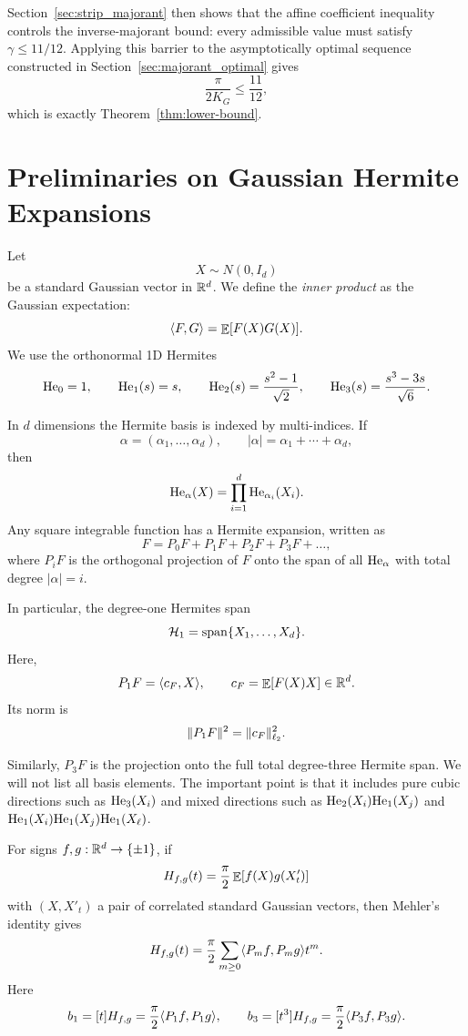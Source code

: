 Section~\ref{sec:strip_majorant} then shows that the affine coefficient inequality controls the inverse-majorant bound: every admissible value must satisfy $\gamma\le11/12$. Applying this barrier to the asymptotically optimal sequence constructed in Section~\ref{sec:majorant_optimal} gives
\[
        \frac{\pi}{2K_G}\le\frac{11}{12},
\]
which is exactly Theorem~\ref{thm:lower-bound}.

\section{Preliminaries on Gaussian Hermite Expansions}
\label{sec:preliminaries}

Let
\[
        X\sim N(0,I_d)
\]
be a standard Gaussian vector in $\mathbb{R}^d$. We define the \textit{inner product} as the Gaussian expectation:
\[
        \langle F,G\rangle=\mathop{\mathbb{E}}[F(X)G(X)].
\]
We use the orthonormal 1D Hermites
\[
        \mathrm{He}_0=1,\qquad
        \mathrm{He}_1(s)=s,\qquad
        \mathrm{He}_2(s)=\frac{s^2-1}{\sqrt2},\qquad
        \mathrm{He}_3(s)=\frac{s^3-3s}{\sqrt6}.
\]

In $d$ dimensions the Hermite basis is indexed by multi-indices. If
\[
        \alpha=(\alpha_1,\ldots,\alpha_d),
        \qquad |\alpha|=\alpha_1+\cdots+\alpha_d,
\]
then
\[
        \mathrm{He}_\alpha(X)=\prod_{i=1}^d \mathrm{He}_{\alpha_i}(X_i).
\]
Any square integrable function has a Hermite expansion, written as
\[
        F=P_0F+P_1F+P_2F+P_3F+\ldots,
\]
where $P_iF$ is the orthogonal projection of $F$ onto the span of all $\mathrm{He}_\alpha$ with total degree $|\alpha|=i$.

In particular, the degree-one Hermites span
\[
        \mathcal H_1=\operatorname{span}\{X_1,\ldots,X_d\}.
\]
Here,
\[
        P_1F=\langle c_F,X\rangle,
        \qquad
        c_F=\mathop{\mathbb{E}}[F(X)X]\in\mathbb{R}^d.
\]
Its norm is
\[
        \lVert P_1F\rVert^2=\lVert c_F\rVert_{\ell_2}^2.
\]

Similarly, $P_3F$ is the projection onto the full total degree-three Hermite span. We will not list all basis elements. The important point is that it includes pure cubic directions such as $\mathrm{He}_3(X_i)$ and mixed directions such as $\mathrm{He}_2(X_i)\mathrm{He}_1(X_j)$ and $\mathrm{He}_1(X_i)\mathrm{He}_1(X_j)\mathrm{He}_1(X_\ell)$.

For signs $f,g:\mathbb{R}^d\to\{\pm1\}$, if
\[
        H_{f,g}(t)=\frac\pi2\mathop{\mathbb{E}}[f(X)g(X'_t)]
\]
with $(X,X'_t)$ a pair of correlated standard Gaussian vectors, then Mehler's identity gives
\[
        H_{f,g}(t)=\frac\pi2\sum_{m\ge0}\langle P_mf,P_mg\rangle t^m.
\]
Here
\[
        b_1=[t]H_{f,g}=\frac\pi2\langle P_1f,P_1g\rangle,
        \qquad
        b_3=[t^3]H_{f,g}=\frac\pi2\langle P_3f,P_3g\rangle.
\]

